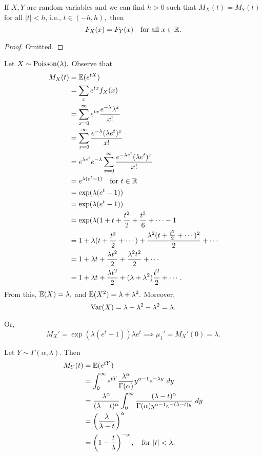 \begin{prop}
If $X,Y$ are random variables and we can find $h>0$ such that $M_X(t)=M_Y(t)$ for all $|t|<h$, i.e., $t\in (-h,h),$ then 
$$
F_X(x)=F_Y(x) \quad \text{for all } x\in \mathbb R.
$$
\end{prop}

\begin{proof}
Omitted. 
\end{proof}

\begin{eg}
Let $X\sim \operatorname*{Poisson}(\lambda).$ Observe that
\begin{align*}
    M_X(t)&=\mathbb E(e^{tX})\\
    &=\sum_x e^{tx}f_X(x) \\
    &= \sum^\infty_{x=0}e^{tx}\frac{e^{-\lambda}\lambda^x}{x!} \\
    &= \sum^\infty_{x=0} \frac{e^{-\lambda}(\lambda e^t)^x}{x!} \\
    &=e^{\lambda e^t}e^{-\lambda}\sum^\infty_{x=0}\frac{e^{-\lambda e^t}(\lambda e^t)^x}{x!} \\
    &=e^{\lambda(e^t-1)}\quad \text{for } t\in \mathbb R \\
    &=\exp(\lambda(e^t-1)) \\
    &=\exp(\lambda(e^t-1)) \\
    &=\exp(\lambda(1+t+\frac{t^2}{2}+\frac{t^3}{6}+\cdots-1\\
    &=1+\lambda(t+\frac{t^2}{2}+\cdots)+\frac{\lambda^2(t+\frac{t^2}{2}+\cdots)^2}{2}+\cdots \\
    &=1+\lambda t +\frac{\lambda t^2}{2}+\frac{\lambda^2t^2}{2} +\cdots \\
    &=1+\lambda t +\frac{\lambda t^2}{2}+(\lambda+\lambda^2)\frac{t^2}{2}+\cdots.
\end{align*}
From this, $\mathbb E(X)=\lambda,$ and $\mathbb E(X^2)=\lambda+\lambda^2.$ Moreover,
$$
\operatorname*{Var}(X)=\lambda+\lambda^2-\lambda^2=\lambda.
$$

Or,
$$
M_X'=\exp(\lambda(e^t-1))\lambda e^t \implies \mu_1'=M_X'(0)=\lambda.
$$
\end{eg}

\begin{eg}
Let $Y\sim \Gamma(\alpha, \lambda).$ Then
\begin{align*}
    M_Y(t)&=\EE(e^{tY}) \\
    &=\int^\infty_0 e^{tY}\frac{\lambda^\alpha}{\Gamma(\alpha)}y^{\alpha-1}e^{-\lambda y} \ dy \\
    &=\frac{\lambda^\alpha}{(\lambda-t)^\alpha}\int^\infty_0\frac{(\lambda -t)^\alpha}{\Gamma(\alpha) y^{\alpha-1}e^{-(\lambda-t)y}} \ dy \\
    &=\left(\frac{\lambda}{\lambda-t}\right)^\alpha \\
    &=\left(1-\frac{t}{\lambda}\right)^{-\alpha}, \quad \text{for } |t|< \lambda.
\end{align*}
\end{eg}

